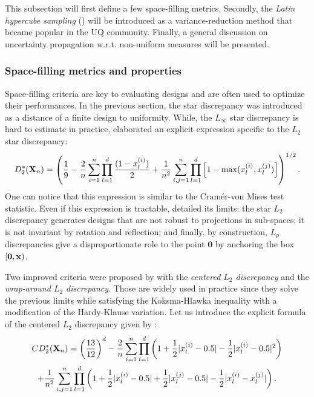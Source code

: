 This subsection will first define a few space-filling metrics. 
Secondly, the \textit{Latin hypercube sampling} () will be introduced as a variance-reduction method that became popular in the UQ community. 
Finally, a general discussion on uncertainty propagation w.r.t. non-uniform measures will be presented.

\subsubsection{Space-filling metrics and properties}
Space-filling criteria are key to evaluating designs and are often used to optimize their performances. 
In the previous section, the star discrepancy was introduced as a distance of a finite design to uniformity. 
While, the $L_\infty$ star discrepancy is hard to estimate in practice, \citet{warnock_1972} elaborated an explicit expression specific to the $L_2$ star discrepancy: 
\begin{equation}
    D^*_2({\bf X}_n) = \left(\frac19 - \frac2n \sum_{i=1}^{n} \prod_{l=1}^{d} \frac{(1-x_l^{(i)})}{2} + \frac{1}{n^2}\sum_{i,j=1}^{n} \prod_{l=1}^{d} \left[1 - \max(x_l^{(i)}, x_l^{(j)})\right]\right)^{1/2}.
\end{equation}
One can notice that this expression is similar to the Cramér-von Mises test statistic. 
Even if this expression is tractable, \citet{fang_liu_2018} detailed its limits: 
the star $L_2$ discrepancy generates designs that are not robust to projections in sub-spaces; 
it is not invariant by rotation and reflection; 
and finally, by construction, $L_p$ discrepancies give a disproportionate role to the point $\mathbf{0}$ by anchoring the box $[\mathbf{0}, {\bf x})$.

Two improved criteria were proposed by \citet{hickernell_1998} with the \textit{centered $L_2$ discrepancy} and the \textit{wrap-around $L_2$ discrepancy}. 
Those are widely used in practice since they solve the previous limits while satisfying the Koksma-Hlawka inequality with a modification of the Hardy-Klause variation. 
Let us introduce the explicit formula of the centered $L_2$ discrepancy given by \citet{hickernell_1998}:
\begin{multline} CD^*_2({\bf X}_n)  = \left(\frac{13}{12}\right)^{d} - \frac{2}{n} \sum_{i=1}^{n} \prod_{l=1}^{d} \left( 1 + \frac{1}{2} |x_l^{(i)} - 0.5| - \frac{1}{2} |x_l^{(i)} - 0.5|^2 \right)\\
    + \frac{1}{n^2} \sum_{i,j=1}^{n} \prod_{l=1}^{d} \left( 1 + \frac{1}{2} |x_l^{(i)} - 0.5| + \frac{1}{2} |x_l^{(j)} - 0.5| - \frac{1}{2} |x_l^{(i)} - x_l^{(j)}| \right).
\end{multline}

